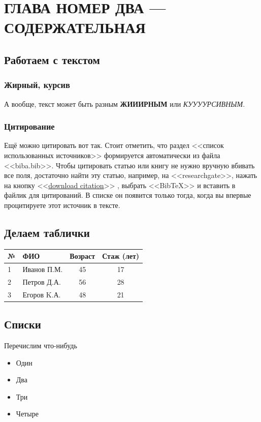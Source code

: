 \chapter{ГЛАВА НОМЕР ДВА --- СОДЕРЖАТЕЛЬНАЯ}
\label{ch:2}
    \section{Работаем с текстом}
        \subsection{Жирный, курсив}
        А вообще, текст может быть разным \textbf{ЖИИИРНЫМ} или \textit{КУУУУРСИВНЫМ}.
        \subsection{Цитирование}
        Ещё можно цитировать вот так\cite{bellman2003dynamic, gartner_definition, FRS1901LIIIOL}.
        Стоит отметить, что раздел <<список использованных источников>> формируется автоматически из файла <<biba.bib>>. Чтобы цитировать статью или книгу не нужно вручную вбивать все поля, достаточно найти эту статью, например, на <<researchgate>>, нажать на кнопку <<\href{https://www.researchgate.net/publication/346702745_Cooperative-Coevolution-CMA-ES_with_Two-Stage_Grouping/citation/download}{download citation}>> , выбрать <<BibTeX>> и вставить в файлик для цитирований. В списке он появится только тогда, когда вы впервые процитируете этот источник в тексте\cite{inproceedings}.
    
    
     
    \section{Делаем таблички}
        \begin{tabular}{l||l|cc}
            \hline
            № & ФИО & Возраст & Стаж (лет)\\
            \hline\hline
            1 & Иванов П.М. & 45 & 17 \\
            2 & Петров Д.А. & 56 & 28 \\
            3 & Егоров K.А. & 48 & 21
        \end{tabular}


    \section{Списки}
        Перечислим что-нибудь
        \begin{itemize}
            \item Один
            \item Два
            \item Три
            \item Четыре
        \end{itemize}


